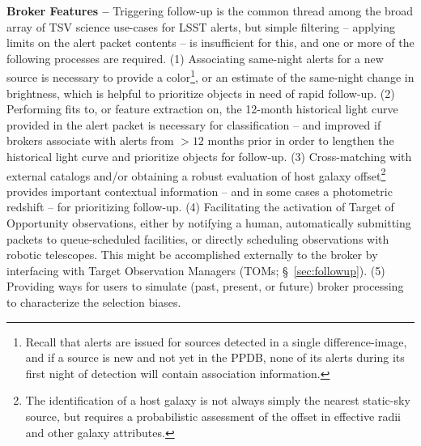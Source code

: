 
{\bf Broker Features --}
Triggering follow-up is the common thread among the broad array of TSV science use-cases for LSST alerts, but simple filtering -- applying limits on the alert packet contents -- is insufficient for this, and one or more of the following processes are required.
(1) Associating same-night alerts for a new source is necessary to provide a color\footnote{Recall that alerts are issued for sources detected in a single difference-image, and if a source is new and not yet in the PPDB, none of its alerts during its first night of detection will contain association information.}, or an estimate of the same-night change in brightness, which is helpful to prioritize objects in need of rapid follow-up.
(2) Performing fits to, or feature extraction on, the 12-month historical light curve provided in the alert packet is necessary for classification -- and improved if brokers associate with alerts from $>12$ months prior in order to lengthen the historical light curve and prioritize objects for follow-up.
(3) Cross-matching with external catalogs and/or obtaining a robust evaluation of host galaxy offset\footnote{The identification of a host galaxy is not always simply the nearest static-sky source, but requires a probabilistic assessment of the offset in effective radii and other galaxy attributes.} provides important contextual information -- and in some cases a photometric redshift -- for prioritizing follow-up.
(4) Facilitating the activation of Target of Opportunity observations, either by notifying a human, automatically submitting packets to queue-scheduled facilities, or directly scheduling observations with robotic telescopes.
This might be accomplished externally to the broker by interfacing with Target Observation Managers (TOMs; \S~\ref{sec:followup}).
(5) Providing ways for users to simulate (past, present, or future) broker processing to characterize the selection biases.

